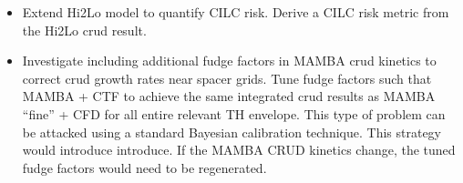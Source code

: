 \begin{itemize}
	\item Extend Hi2Lo model to quantify CILC risk.  Derive a CILC risk metric from the Hi2Lo crud result.
	
		\item Investigate including additional fudge factors in MAMBA crud kinetics to correct crud growth rates near spacer grids.  Tune fudge factors such that MAMBA + CTF to achieve the same integrated crud results as MAMBA ``fine'' + CFD for all entire relevant TH envelope.  This type of problem can be attacked using a standard Bayesian calibration technique.   This strategy would introduce introduce.  If the MAMBA CRUD kinetics change, the tuned fudge factors would need to be regenerated.
	
\end{itemize}
